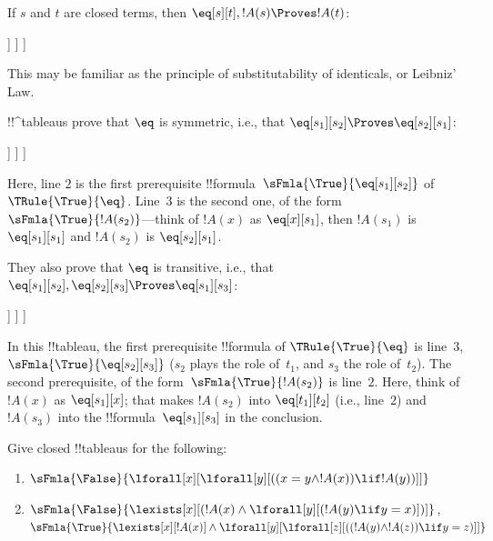 \begin{ex}
If $s$ and $t$ are closed terms, then $\eq[s][t], !A(s)
\Proves !A(t)$:
\begin{oltableau}
  [\sFmla{\False}{\formula{A}(t)}, just = \TAss
    [\sFmla{\True}{\eq[s][t]}, just = \TAss
      [\sFmla{\True}{\formula{A}(s)}, just = \TAss
        [\sFmla{\True}{\formula{A}(t)}, just={\TRule{\True}{\eq}[2, 3]}, close]
      ]
    ]
  ]
\end{oltableau}
This may be familiar as the principle of substitutability of
identicals, or Leibniz' Law.

!!^{tableau}s prove that $\eq$ is symmetric, i.e., that $\eq[s_1][s_2]
\Proves \eq[s_2][s_1]$:
\begin{oltableau}
  [\sFmla{\False}{\eq[s_2][s_1]}, just = \TAss
    [\sFmla{\True}{\eq[s_1][s_2]}, just = \TAss
      [\sFmla{\True}{\eq[s_1][s_1]}, just = {$\eq$}
        [\sFmla{\True}{\eq[s_2][s_1]}, just = {\TRule{\True}{\eq}[2, 3]}, close]
      ]
    ]
  ]
\end{oltableau}
Here, line $2$ is the first prerequisite
!!{formula}~$\sFmla{\True}{\eq[s_1][s_2]}$ of $\TRule{\True}{\eq}$.
Line~$3$ is the second one, of the form $\sFmla{\True}{!A(s_2)}$---think of
$!A(x)$ as
$\eq[x][s_1]$, then $!A(s_1)$ is $\eq[s_1][s_1]$ and $!A(s_2)$ is $\eq[s_2][s_1]$.

They also prove that $\eq$ is transitive, i.e., that $\eq[s_1][s_2],
\eq[s_2][s_3] \Proves \eq[s_1][s_3]$:
\begin{oltableau}
  [\sFmla{\False}{\eq[s_1][s_3]}, just = \TAss
    [\sFmla{\True}{\eq[s_1][s_2]}, just = \TAss
      [\sFmla{\True}{\eq[s_2][s_3]}, just = \TAss
        [\sFmla{\True}{\eq[s_1][s_3]}, just = {\TRule{\True}{\eq}[3, 2]}, close]
      ]
    ]
  ]
\end{oltableau}
In this !!{tableau}, the first prerequisite !!{formula} of
$\TRule{\True}{\eq}$ is line~$3$, $\sFmla{\True}{\eq[s_2][s_3]}$
($s_2$ plays the role of~$t_1$, and $s_3$ the role of~$t_2$). The
second prerequisite, of the form~$\sFmla{\True}{!A(s_2)}$ is line~$2$.
Here, think of $!A(x)$ as $\eq[s_1][x]$; that makes $!A(s_2)$ into
$\eq[t_1][t_2]$ (i.e., line~$2$) and $!A(s_3)$ into the
!!{formula}~$\eq[s_1][s_3]$ in the conclusion.
\end{ex}

\begin{prob}
Give closed !!{tableau}s for the following:
\begin{enumerate}
\item $\sFmla{\False}{\lforall[x][\lforall[y][((x = y \land !A(x))
      \lif !A(y))]]}$
\item $\sFmla{\False}{\lexists[x][(!A(x) \land
    \lforall[y][(!A(y) \lif y = x)])]}$,\\
  $\sFmla{\True}{\lexists[x][!A(x)] \land
    \lforall[y][\lforall[z][((!A(y) \land !A(z)) \lif y = z)]]}$
\end{enumerate}
\end{prob}


